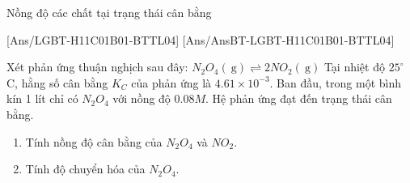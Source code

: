 \begin{dang}{Nồng độ các chất tại trạng thái cân bằng}
\end{dang}
[Ans/LGBT-H11C01B01-BTTL04]
[Ans/AnsBT-LGBT-H11C01B01-BTTL04]
\begin{bt}
	Xét phản ứng thuận nghịch sau đây:
	$N_2O_4(\mathrm{~g}) \rightleftharpoons 2NO_2(\mathrm{~g})$
	Tại nhiệt độ $25^{\circ}$C, hằng số cân bằng $K_C$ của phản ứng là $4.61\times10^{-3}$. Ban đầu, trong một bình kín 1 lít chỉ có $N_2O_4$ với nồng độ $0.08 M$. Hệ phản ứng đạt đến trạng thái cân bằng.
	\begin{enumerate}
		\item Tính nồng độ cân bằng của $N_2O_4$ và $NO_2$.
		\item Tính độ chuyển hóa của $N_2O_4$.
	\end{enumerate}
\end{bt}

